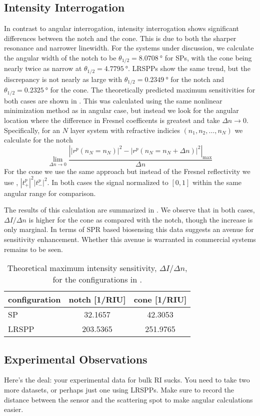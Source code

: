 \subsection{Intensity Interrogation}
In contrast to angular interrogation, intensity interrogation shows
significant differences between the notch and the cone.  This is due to
both the sharper resonance and narrower linewidth.  For the systems under
discussion, we calculate the angular width of the notch to be
$\theta_{1/2}=\SI{8.0708}{\degree}$ for SPs, with the cone being nearly
twice as narrow at $\theta_{1/2}=\SI{4.7795}{\degree}$.  LRSPPs show the same
trend, but the discrepancy is not nearly as large with
$\theta_{1/2}=\SI{0.2349}{\degree}$ for the notch and
$\theta_{1/2}=\SI{0.2325}{\degree}$ for the cone.  The theoretically
predicted maximum
sensitivities for both cases are shown in .  This
was calculated using the same nonlinear minimization method as in angular
case, but instead we look for the angular location where the difference in Fresnel
coefficents is greatest and take $\Delta n \to 0$.  Specifically, for an
$N$ layer system with refractive indicies $(n_1,n_2, \ldots,n_N)$ we
calculate for the notch
\begin{equation}
								\lim_{\Delta n \to 0}\frac{\left||r^p(n_N=n_N)|^2 - |r^p(n_N=n_N + \Delta n)|^2\right|_\mathrm{max}}{\Delta n}
\label{eqn:fresnelsenspertrubation}
\end{equation}
For the cone we use the same approach but instead of the Fresnel
reflectivity we use , $|t^p_+|^2|t^p_-|^2$.  In
both cases the signal normalized to $[0,1]$ within the same angular range
for comparison.

The results of this calculation are summarized in
.  We observe that in both cases, $\Delta I/\Delta
n$ is higher for the cone as compared with the notch, though the increase
is only marginal.  In terms of SPR based biosensing this data suggests an
avenue for sensitivity enhancement.  Whether this avenue is warranted in
commercial systems remains to be seen.
\begin{table}[ht]
\centering
{}
\begin{tabular}{lSS}
\toprule
{configuration} & {notch [1/RIU]} & {cone [1/RIU]} \\
\midrule
SP & 32.1657 & 42.3053 \\
LRSPP & 203.5365 & 251.9765 \\
\bottomrule
\end{tabular}
\caption{Theoretical maximum intensity sensitivity, $\Delta I/\Delta n$,
								for the configurations in . }
\label{tbl:intensitysens}
\end{table}

\subsection{Experimental Observations}
Here's the deal: your experimental data for bulk RI sucks.  You need to
take two more datasets, or perhaps just one using LRSPPs.  Make sure to
record the distance between the sensor and the scattering spot to make
angular calculations easier.

